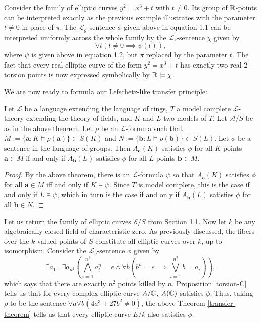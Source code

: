 \begin{example}
Consider the family of elliptic curves $y^2=x^3+t$ with $t\neq 0$. Its group of $\mathbb{R}$-points can be interpreted exactly as the previous example illustrates with the parameter $t\neq 0$ in place of $\pi$. The $\mathcal{L}_g$-sentence $\phi$ given above in equation 1.1 can be interpreted uniformly across the whole family by the $\mathcal{L}_r$-sentence $\chi$ given by $$\forall t (t\neq 0\implies \psi(t)),$$ where $\psi$ is given above in equation 1.2, but $\pi$ replaced by the parameter $t$. The fact that every real elliptic curve of the form $y^2=x^3+t$ has exactly two real 2-torsion points is now expressed symbolically by $\mathbb{R}\models\chi$.
\end{example}

We are now ready to formula our Lefschetz-like transfer principle:

\begin{theorem}
\label{transfer-theorem}
Let $\mathcal{L}$ be a language extending the language of rings, $T$ a model complete $\mathcal{L}$-theory extending the theory of fields, and $K$ and $L$ two models of $T$. Let $\mathcal{A}/S$ be as in the above theorem. Let $\rho$ be an $\mathcal{L}$-formula such that $M:=\{\mathbf{a}:K\models \rho(\mathbf{a})\}\subset S(K)$ and $N:=\{\mathbf{b}:L\models \rho(\mathbf{b})\}\subset S(L)$. Let $\phi$ be a sentence in the language of groups. Then $A_{\mathbf{a}}(K)$ satisfies $\phi$ for all $K$-points $\mathbf{a}\in M$ if and only if $A_{\mathbf{b}}(L)$ satisfies $\phi$ for all $L$-points $\mathbf{b}\in M$.
\end{theorem}
\begin{proof}
By the above theorem, there is an $\mathcal{L}$-formula $\psi$ so that $A_{\mathbf{a}}(K)$ satisfies $\phi$ for all $\mathbf{a}\in M$ iff and only if $K\models \psi$. Since $T$ is model complete, this is the case if and only if $L\models \psi$, which in turn is the case if and only if $A_{\mathbf{b}}(L)$ satisfies $\phi$ for all $\mathbf{b}\in N$.
\end{proof}

\begin{example}
Let us return the family of elliptic curves $\mathcal{E}/S$ from Section 1.1. Now let $k$ be any algebraically closed field of characteristic zero. As previously discussed, the fibers over the $k$-valued points of $S$ constitute all elliptic curves over $k$, up to isomorphism. Consider the $\mathcal{L}_g$-sentence $\phi$ given by $$\exists a_1\dots\exists a_{n^2}\left(\bigwedge_{i=1}^{n^2} a_i^{n}=e\wedge \forall b(b^n=e\implies \bigvee_{i=1}^{n^2}b=a_i)\right),$$ which says that there are exactly $n^2$ points killed by $n$. Proposition \ref{torsion-C} tells us that for every complex elliptic curve $A/\mathbb{C}$, $A(\mathbb{C})$ satisfies $\phi$. Thus, taking $\rho$ to be the sentence $\forall a\forall b(4a^3+27b^2\neq 0)$, the above Theorem \ref{transfer-theorem} tells us that every elliptic curve $E/k$ also satisfies $\phi$.
\end{example}

